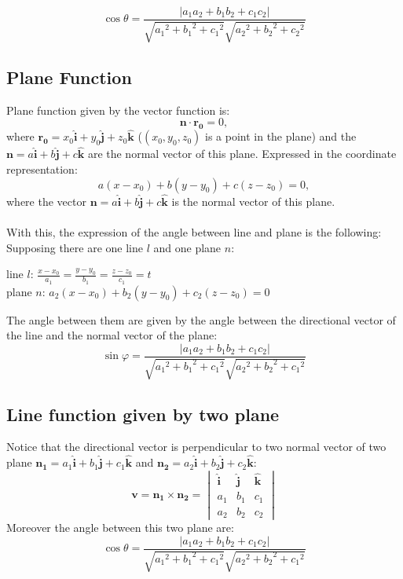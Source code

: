 \begin{equation}
\boxed{\cos \theta =\frac{|a_1a_2+b_1b_2+c_1c_2|}{\sqrt{{a_1}^2+{b_1}^2+{c_1}^2}\sqrt{{a_2}^2+{b_2}^2+{c_2}^2}}}
\end{equation}



\subsection{Plane Function}
Plane function given by the vector function is:
\[\mathbf{n}\cdot \mathbf{r_0}=0,\]
where $\mathbf{r_0}=x_0\mathbf{\hat{i}}+y_0\mathbf{\hat{j}}+z_0\mathbf{\hat{k}}$ ($(x_0,y_0,z_0)$ is a point in the plane) and the $\mathbf{n}=a\mathbf{\hat{i}}+b\mathbf{\hat{j}}+c\mathbf{\hat{k}}$ are the normal vector of this plane.
Expressed in the coordinate representation:
\[a(x-x_0)+b(y-y_0)+c(z-z_0)=0,\]
where the vector $\mathbf{n}=a\mathbf{\hat{i}}+b\mathbf{\hat{j}}+c\mathbf{\hat{k}}$ is the normal vector of this plane.\\ \\
With this, the expression of the angle between line and plane is the following:\\
Supposing there are one line $l$ and one plane $n$:
\begin{center}
line $l$: $\frac{x-x_0}{a_1}=\frac{y-y_0}{b_1}=\frac{z-z_0}{c_1}=t$\\
plane $n$: $a_2(x-x_0)+b_2(y-y_0)+c_2(z-z_0)=0$
\end{center}
The angle between them are given by the angle between the directional vector of the line and the normal vector of the plane:
\begin{equation}
\boxed{\sin \varphi =\frac{|a_1a_2+b_1b_2+c_1c_2|}{\sqrt{{a_1}^2+{b_1}^2+{c_1}^2}\sqrt{{a_2}^2+{b_2}^2+{c_1}^2}}}
\end{equation}

\subsection{Line function given by two plane}
Notice that the directional vector is perpendicular to two normal vector of two plane $\mathbf{n_1}=a_1\mathbf{\hat{i}}+b_1\mathbf{\hat{j}}+c_1\mathbf{\hat{k}}$ and $\mathbf{n_2}=a_2\mathbf{\hat{i}}+b_2\mathbf{\hat{j}}+c_2\mathbf{\hat{k}}$:
\begin{equation}
\boxed{\mathbf{v}=\mathbf{n_1}\times \mathbf{n_2}=
\begin{vmatrix}
\mathbf{\hat{i}} & \mathbf{\hat{j}} & \mathbf{\hat{k}}\\
a_1 & b_1 & c_1 \\
a_2 & b_2 & c_2
\end{vmatrix}
}
\end{equation}
Moreover the angle between this two plane are:
\begin{equation}
\boxed{\cos \theta =\frac{|a_1a_2+b_1b_2+c_1c_2|}{\sqrt{{a_1}^2+{b_1}^2+{c_1}^2}\sqrt{{a_2}^2+{b_2}^2+{c_1}^2}}}
\end{equation}

